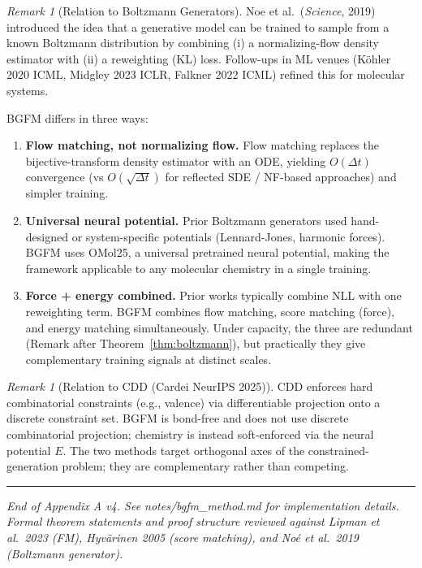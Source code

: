\documentclass[11pt]{article}
\theoremstyle{remark}
\newtheorem{remark}[theorem]{Remark}
\theoremstyle{plain}
\begin{document}
\begin{remark}[Relation to Boltzmann Generators]
Noe et al.~(\textit{Science}, 2019) introduced the idea that a
generative model can be trained to sample from a known Boltzmann
distribution by combining (i) a normalizing-flow density estimator
with (ii) a reweighting (KL) loss. Follow-ups in ML venues
(K\"ohler 2020 ICML, Midgley 2023 ICLR, Falkner 2022 ICML) refined
this for molecular systems.

BGFM differs in three ways:
\begin{enumerate}
\item \textbf{Flow matching, not normalizing flow.} Flow matching
      replaces the bijective-transform density estimator with an ODE,
      yielding $O(\Delta t)$ convergence (vs $O(\sqrt{\Delta t})$ for
      reflected SDE / NF-based approaches) and simpler training.
\item \textbf{Universal neural potential.} Prior Boltzmann generators
      used hand-designed or system-specific potentials (Lennard-Jones,
      harmonic forces). BGFM uses OMol25, a universal pretrained
      neural potential, making the framework applicable to any
      molecular chemistry in a single training.
\item \textbf{Force + energy combined.} Prior works typically combine
      NLL with one reweighting term. BGFM combines flow matching, score
      matching (force), and energy matching simultaneously. Under
      capacity, the three are redundant (Remark after
      Theorem~\ref{thm:boltzmann}), but practically they give
      complementary training signals at distinct scales.
\end{enumerate}
\end{remark}

\begin{remark}[Relation to CDD (Cardei NeurIPS 2025)]
CDD enforces hard combinatorial constraints (e.g., valence) via
differentiable projection onto a discrete constraint set. BGFM is
bond-free and does not use discrete combinatorial projection; chemistry
is instead soft-enforced via the neural potential $E$. The two methods
target orthogonal axes of the constrained-generation problem; they
are complementary rather than competing.
\end{remark}

\bigskip
\hrule
\bigskip

\emph{End of Appendix A v4. See notes/bgfm\_method.md for
implementation details. Formal theorem statements and proof structure
reviewed against Lipman et al.~2023 (FM), Hyv\"arinen 2005 (score
matching), and No\'e et al.~2019 (Boltzmann generator).}
\end{document}

